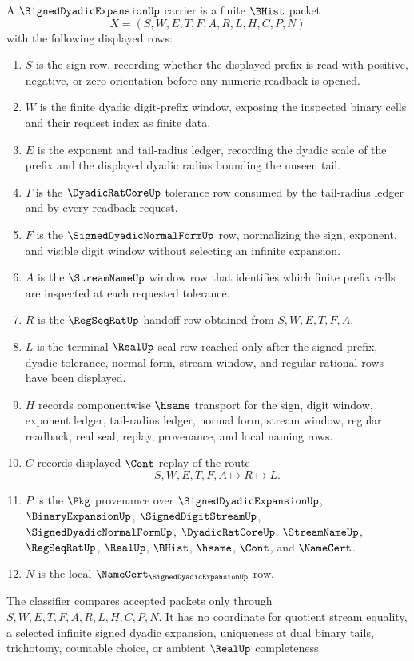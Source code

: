 \begin{definition}
\label{def:signed-dyadic-expansion-carrier}
A $\SignedDyadicExpansionUp$ carrier is a finite $\BHist$ packet
$$
X=(S,W,E,T,F,A,R,L,H,C,P,N)
$$
with the following displayed rows:
\begin{enumerate}
\item $S$ is the sign row, recording whether the displayed prefix is read with positive, negative, or zero orientation before any numeric readback is opened.
\item $W$ is the finite dyadic digit-prefix window, exposing the inspected binary cells and their request index as finite data.
\item $E$ is the exponent and tail-radius ledger, recording the dyadic scale of the prefix and the displayed dyadic radius bounding the unseen tail.
\item $T$ is the $\DyadicRatCoreUp$ tolerance row consumed by the tail-radius ledger and by every readback request.
\item $F$ is the $\SignedDyadicNormalFormUp$ row, normalizing the sign, exponent, and visible digit window without selecting an infinite expansion.
\item $A$ is the $\StreamNameUp$ window row that identifies which finite prefix cells are inspected at each requested tolerance.
\item $R$ is the $\RegSeqRatUp$ handoff row obtained from $S,W,E,T,F,A$.
\item $L$ is the terminal $\RealUp$ seal row reached only after the signed prefix, dyadic tolerance, normal-form, stream-window, and regular-rational rows have been displayed.
\item $H$ records componentwise $\hsame$ transport for the sign, digit window, exponent ledger, tail-radius ledger, normal form, stream window, regular readback, real seal, replay, provenance, and local naming rows.
\item $C$ records displayed $\Cont$ replay of the route
$$
S,W,E,T,F,A \longmapsto R \longmapsto L .
$$
\item $P$ is the $\Pkg$ provenance over $\SignedDyadicExpansionUp$, $\BinaryExpansionUp$, $\SignedDigitStreamUp$, $\SignedDyadicNormalFormUp$, $\DyadicRatCoreUp$, $\StreamNameUp$, $\RegSeqRatUp$, $\RealUp$, $\BHist$, $\hsame$, $\Cont$, and $\NameCert$.
\item $N$ is the local $\NameCert_{\SignedDyadicExpansionUp}$ row.
\end{enumerate}
The classifier compares accepted packets only through $S,W,E,T,F,A,R,L,H,C,P,N$. It has no coordinate for quotient stream equality, a selected infinite signed dyadic expansion, uniqueness at dual binary tails, trichotomy, countable choice, or ambient $\RealUp$ completeness.
\end{definition}

